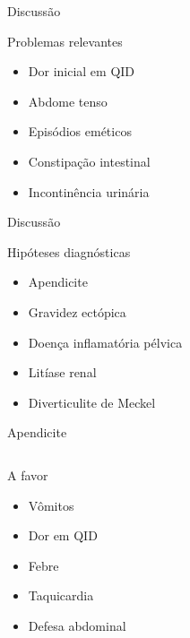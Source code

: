 \begin{frame}{Discussão}
\begin{block}{Problemas relevantes}
    \begin{itemize}
        \item Dor inicial em QID
        \item Abdome tenso
        \item Episódios eméticos
        \item Constipação intestinal
        \item Incontinência urinária
    \end{itemize}{}
\end{block}
\end{frame}

\begin{frame}{Discussão}
\begin{block}{Hipóteses diagnósticas}
    \pause
    \begin{itemize}
        \item Apendicite \pause
        \item Gravidez ectópica \pause
        \item Doença inflamatória pélvica \pause
        \item Litíase renal \pause
        \item Diverticulite de Meckel
    \end{itemize}{}
\end{block}
\end{frame}


\begin{frame}{Apendicite}
    \begin{columns}
        \begin{block}{A favor}
            \begin{itemize}
            \item Vômitos
            \item Dor em QID
            \item Febre
            \item Taquicardia
            \item Defesa abdominal
            \end{itemize}
        \end{block}
    \end{columns}
\end{frame}


